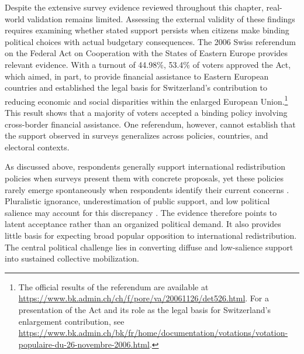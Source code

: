 

Despite the extensive survey evidence reviewed throughout this chapter, real-world validation remains limited. Assessing the external validity of these findings requires examining whether stated support persists when citizens make binding political choices with actual budgetary consequences. The 2006 Swiss referendum on the Federal Act on Cooperation with the States of Eastern Europe provides relevant evidence. With a turnout of 44.98\%, 53.4\% of voters approved the Act, which aimed, in part, to provide financial assistance to Eastern European countries and established the legal basis for Switzerland's contribution to reducing economic and social disparities within the enlarged European Union.\footnote{The official results of the referendum are available at \url{https://www.bk.admin.ch/ch/f/pore/va/20061126/det526.html}. For a presentation of the Act and its role as the legal basis for Switzerland's enlargement contribution, see \url{https://www.bk.admin.ch/bk/fr/home/documentation/votations/votation-populaire-du-26-novembre-2006.html}.} This result shows that a majority of voters accepted a binding policy involving cross-border financial assistance. One referendum, however, cannot establish that the support observed in surveys generalizes across policies, countries, and electoral contexts.


As discussed above, respondents generally support international redistribution policies when surveys present them with concrete proposals, yet these policies rarely emerge spontaneously when respondents identify their current concerns \citep{fabre_majority_2025,fabre_public_2026}. Pluralistic ignorance, underestimation of public support, and low political salience may account for this discrepancy \citep{andre_globally_2024,fabre_public_2026,mildenberger_beliefs_2017}. The evidence therefore points to latent acceptance rather than an organized political demand. It also provides little basis for expecting broad popular opposition to international redistribution. The central political challenge lies in converting diffuse and low-salience support into sustained collective mobilization.

